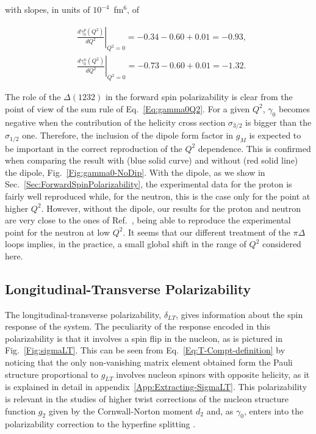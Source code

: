 \documentclass[prc,twocolumn,showpacs,preprintnumbers,amsmath,amssymb
,superscriptaddress,a4paper,nofootinbib
]{revtex4-1}
\begin{document}

with slopes, in units of $10^{-4}$~fm$^6$, of 

\begin{align}
&\left.\frac{d\gamma_0^p (Q^2)}{dQ^2}\right|_{Q^2=0}=  -0.34  -0.60 +0.01 = -0.93,  \\
&\left.\frac{d\gamma_0^n (Q^2)}{dQ^2}\right|_{Q^2=0}=  -0.73 -0.60 +0.01 =-1.32.
\end{align}






The role of the $\Delta(1232)$ in the forward spin polarizability is clear from the point of view of the sum rule of Eq.~\eqref{Eq:gamma0Q2}. 
For a given $Q^2$, $\gamma_0$ becomes negative when the contribution of the helicity cross section $\sigma_{3/2}$ is bigger than the $\sigma_{1/2}$ one. 
Therefore, the inclusion of the dipole form factor in $g_{M}$ is expected to be important in the correct reproduction of the $Q^2$ dependence.
This is confirmed when comparing the result with (blue solid curve) and without (red solid line) the dipole, Fig.~\ref{Fig:gamma0-NoDip}. 
With the dipole, as we show in Sec.~\ref{Sec:ForwardSpinPolarizability}, the experimental data for the proton is fairly well reproduced while, for the neutron, this is the case only for the point at higher $Q^2$.
However, without the dipole, our results for the proton and neutron are very close to the ones of Ref.~\cite{Bernard:2012hb}, being able to reproduce the experimental point for the neutron at low $Q^2$.
It seems that our different treatment of the $\pi \Delta$ loops implies, in the practice, a small global shift in the range of $Q^2$ considered here.




\subsection{Longitudinal-Transverse Polarizability}
\label{Sec:LongitudinalTransversePolarizability}

The longitudinal-transverse polarizability, $\delta_{LT}$, gives information about the spin response of the system.
The peculiarity of the response encoded in this polarizability is that it involves a spin flip in the nucleon, as is pictured in Fig.~\ref{Fig:sigmaLT}.
This can be seen from Eq.~\eqref{Eq:T-Compt-definition} by noticing that the only non-vanishing matrix element obtained form the Pauli structure proportional to $g_{LT}$ involves nucleon spinors with opposite helicity, as it is explained in detail in appendix~\ref{App:Extracting-SigmaLT}.
This polarizability is relevant in the studies of higher twist corrections of the nucleon structure function $g_2$ given by the Cornwall-Norton moment $d_2$ \cite{Kao:2003jd} and, as $\gamma_0$, enters into the polarizability correction to the hyperfine splitting \cite{Carlson:2008ke}.
\end{document}
